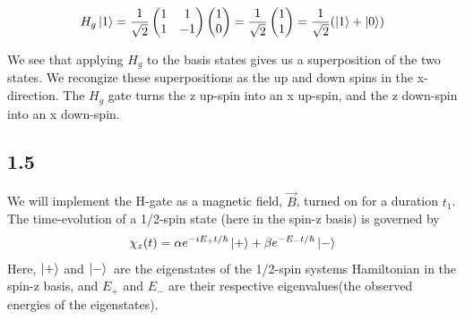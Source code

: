 \documentclass[12p,a4paper]{article}
\newcommand{\0}{\ket{0}}
\newcommand{\1}{\ket{1}}
\renewcommand{\exp}{e^}
\begin{document}
\begin{align*}
    H_g\ket{1} = \frac{1}{\sqrt{2}}\begin{pmatrix} 1 & 1 \\ 1 & -1 \end{pmatrix}\begin{pmatrix} 1 \\ 0 \end{pmatrix} = \frac{1}{\sqrt{2}}\begin{pmatrix} 1 \\ 1 \end{pmatrix} = \frac{1}{\sqrt{2}}\qty(\ket{1} + \ket{0})
\end{align*}

We see that applying $H_g$ to the basis states gives us a superposition of the two states. We recongize these superpositions as the up and down spins in the x-direction. The $H_g$ gate turns the z up-spin into an x up-spin, and the z down-spin into an x down-spin.


\subsection*{1.5}
We will implement the H-gate as a magnetic field, $\vec{B}$, turned on for a duration $t_1$. The time-evolution of a 1/2-spin state (here in the spin-z basis) is governed by
\begin{align}\label{eqn:time}
    \chi_z(t) = \alpha\exp{-iE_+t/\hbar}\ket{+} + \beta\exp{-E_-t/\hbar}\ket{-}
\end{align}
Here, $\ket{+}$ and $\ket{-}$ are the eigenstates of the 1/2-spin systems Hamiltonian in the spin-z basis, and $E_+$ and $E_-$ are their respective eigenvalues(the observed energies of the eigenstates).
\end{document}
